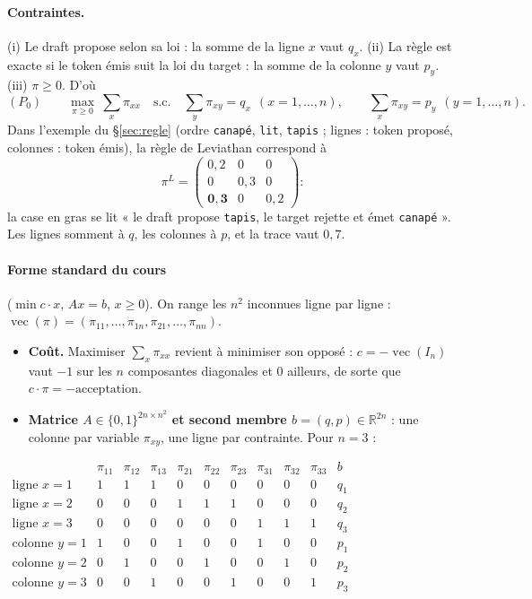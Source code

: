 \documentclass[11pt,a4paper]{article}
\newcommand{\R}{\mathbb{R}}
\newcommand{\vecop}{\operatorname{vec}}
\newcommand{\tok}[1]{\texttt{#1}}
\theoremstyle{plain}
\theoremstyle{definition}
\begin{document}
\paragraph{Contraintes.} (i) Le draft propose selon sa loi : la somme de la ligne $x$ vaut $q_x$. (ii) La règle est exacte si le token émis suit la loi du target : la somme de la colonne $y$ vaut $p_y$. (iii) $\pi\ge0$. D'où
\[(P_0)\qquad \max_{\pi\ge0}\ \sum_x\pi_{xx}\quad\text{s.c.}\quad \sum_y\pi_{xy}=q_x\ \ (x=1,\dots,n),\qquad \sum_x\pi_{xy}=p_y\ \ (y=1,\dots,n).\]
Dans l'exemple du §\ref{sec:regle} (ordre \tok{canapé}, \tok{lit}, \tok{tapis} ; lignes : token proposé, colonnes : token émis), la règle de Leviathan correspond à
\[\pi^L=\begin{pmatrix}0{,}2&0&0\\0&0{,}3&0\\\mathbf{0{,}3}&0&0{,}2\end{pmatrix} :\]
la case en gras se lit « le draft propose \tok{tapis}, le target rejette et émet \tok{canapé} ». Les lignes somment à $q$, les colonnes à $p$, et la trace vaut $0{,}7$.

\paragraph{Forme standard du cours} ($\min c\cdot x$, $Ax=b$, $x\ge0$). On range les $n^2$ inconnues ligne par ligne : $\vecop(\pi)=(\pi_{11},\dots,\pi_{1n},\pi_{21},\dots,\pi_{nn})$.
\begin{itemize}
\item \textbf{Coût.} Maximiser $\sum_x\pi_{xx}$ revient à minimiser son opposé : $c=-\vecop(I_n)$ vaut $-1$ sur les $n$ composantes diagonales et $0$ ailleurs, de sorte que $c\cdot\pi=-\text{acceptation}$.
\item \textbf{Matrice $A\in\{0,1\}^{2n\times n^2}$ et second membre $b=(q,p)\in\R^{2n}$} : une colonne par variable $\pi_{xy}$, une ligne par contrainte. Pour $n=3$ :
\end{itemize}
\begin{center}\small
$\begin{array}{r|ccc|ccc|ccc|c}
 & \pi_{11} & \pi_{12} & \pi_{13} & \pi_{21} & \pi_{22} & \pi_{23} & \pi_{31} & \pi_{32} & \pi_{33} & b\\\hline
\text{ligne }x=1 & 1 & 1 & 1 & 0 & 0 & 0 & 0 & 0 & 0 & q_1\\
\text{ligne }x=2 & 0 & 0 & 0 & 1 & 1 & 1 & 0 & 0 & 0 & q_2\\
\text{ligne }x=3 & 0 & 0 & 0 & 0 & 0 & 0 & 1 & 1 & 1 & q_3\\\hline
\text{colonne }y=1 & 1 & 0 & 0 & 1 & 0 & 0 & 1 & 0 & 0 & p_1\\
\text{colonne }y=2 & 0 & 1 & 0 & 0 & 1 & 0 & 0 & 1 & 0 & p_2\\
\text{colonne }y=3 & 0 & 0 & 1 & 0 & 0 & 1 & 0 & 0 & 1 & p_3
\end{array}$
\end{center}
\end{document}
